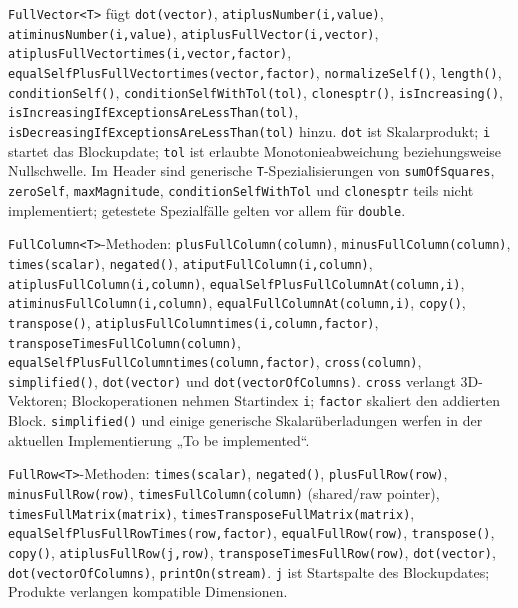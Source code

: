 \documentclass[
  12pt
]{book}
\begin{document}
\texttt{FullVector\textless{}T\textgreater{}} fügt \texttt{dot(vector)},
\texttt{atiplusNumber(i,value)}, \texttt{atiminusNumber(i,value)},
\texttt{atiplusFullVector(i,vector)},
\texttt{atiplusFullVectortimes(i,vector,factor)},
\texttt{equalSelfPlusFullVectortimes(vector,factor)},
\texttt{normalizeSelf()}, \texttt{length()}, \texttt{conditionSelf()},
\texttt{conditionSelfWithTol(tol)}, \texttt{clonesptr()},
\texttt{isIncreasing()},
\texttt{isIncreasingIfExceptionsAreLessThan(tol)},
\texttt{isDecreasingIfExceptionsAreLessThan(tol)} hinzu. \texttt{dot}
ist Skalarprodukt; \texttt{i} startet das Blockupdate; \texttt{tol} ist
erlaubte Monotonieabweichung beziehungsweise Nullschwelle. Im Header
sind generische \texttt{T}-Spezialisierungen von \texttt{sumOfSquares},
\texttt{zeroSelf}, \texttt{maxMagnitude}, \texttt{conditionSelfWithTol}
und \texttt{clonesptr} teils nicht implementiert; getestete Spezialfälle
gelten vor allem für \texttt{double}.

\texttt{FullColumn\textless{}T\textgreater{}}-Methoden:
\texttt{plusFullColumn(column)}, \texttt{minusFullColumn(column)},
\texttt{times(scalar)}, \texttt{negated()},
\texttt{atiputFullColumn(i,column)},
\texttt{atiplusFullColumn(i,column)},
\texttt{equalSelfPlusFullColumnAt(column,i)},
\texttt{atiminusFullColumn(i,column)},
\texttt{equalFullColumnAt(column,i)}, \texttt{copy()},
\texttt{transpose()}, \texttt{atiplusFullColumntimes(i,column,factor)},
\texttt{transposeTimesFullColumn(column)},
\texttt{equalSelfPlusFullColumntimes(column,factor)},
\texttt{cross(column)}, \texttt{simplified()}, \texttt{dot(vector)} und
\texttt{dot(vectorOfColumns)}. \texttt{cross} verlangt 3D-Vektoren;
Blockoperationen nehmen Startindex \texttt{i}; \texttt{factor} skaliert
den addierten Block. \texttt{simplified()} und einige generische
Skalarüberladungen werfen in der aktuellen Implementierung „To be
implemented``.

\texttt{FullRow\textless{}T\textgreater{}}-Methoden:
\texttt{times(scalar)}, \texttt{negated()}, \texttt{plusFullRow(row)},
\texttt{minusFullRow(row)}, \texttt{timesFullColumn(column)} (shared/raw
pointer), \texttt{timesFullMatrix(matrix)},
\texttt{timesTransposeFullMatrix(matrix)},
\texttt{equalSelfPlusFullRowTimes(row,factor)},
\texttt{equalFullRow(row)}, \texttt{transpose()}, \texttt{copy()},
\texttt{atiplusFullRow(j,row)}, \texttt{transposeTimesFullRow(row)},
\texttt{dot(vector)}, \texttt{dot(vectorOfColumns)},
\texttt{printOn(stream)}. \texttt{j} ist Startspalte des Blockupdates;
Produkte verlangen kompatible Dimensionen.
\end{document}
